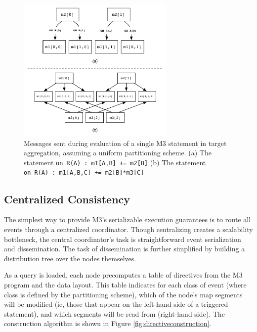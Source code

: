 \documentclass{vldb}
\begin{document}
\begin{figure}
\begin{center}
\includegraphics[width=3in]{graphics/message_passing}
\caption{Messages sent during evaluation of a single M3 statement in target aggregation, assuming a uniform partitioning scheme.  (a) The statement \texttt{on~R(A)~:~m1[A,B]~+=~m2[B]} (b) The statement \texttt{on~R(A)~:~m1[A,B,C]~+=~m2[B]*m3[C]} }
\label{fig:messagepassing}
\end{center}
\end{figure}

\subsection{Centralized Consistency}
The simplest way to provide M3's serializable execution guarantees is to route all events through a centralized coordinator.  Though centralizing creates a scalability bottleneck, the central coordinator's task is straightforward event serialization and dissemination.  The task of dissemination is further simplified by building a distribution tree over the nodes themselves.

As a query is loaded, each node precomputes a table of directives from the M3 program and the data layout.  This table indicates for each class of event (where class is defined by the partitioning scheme), which of the node's map segments will be modified (ie, those that appear on the left-hand side of a triggered statement), and which segments will be read from (right-hand side).  The construction algorithm is shown in Figure \ref{fig:directiveconstruction}.
\end{document}

